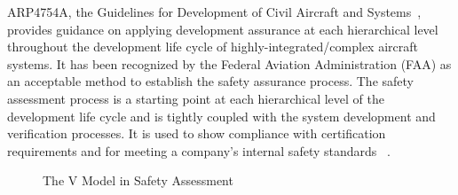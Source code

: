 ARP4754A, the Guidelines for Development of Civil Aircraft and Systems~\cite{SAE:ARP4754A}, provides guidance on applying development assurance at each hierarchical level throughout the development life cycle of highly-integrated/complex aircraft systems. It has been recognized by the Federal Aviation Administration (FAA) as an acceptable method to establish the safety assurance process. The safety assessment process is a starting point at each hierarchical level of the development life cycle and is tightly coupled with the system development and verification processes. It is used to show compliance with certification requirements and for meeting a company's internal safety standards~\cite{SAE:ARP4754A} . 

\begin{figure}[!htb]
        \caption{\label{fig:v2} The V Model in Safety Assessment}
\end{figure}


